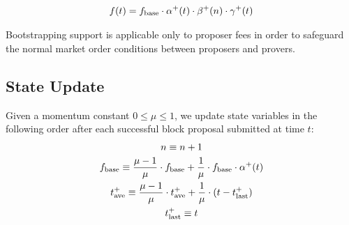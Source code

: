 
\begin{align}
f(t) = f_\textnormal{base} \cdot \alpha^+(t) \cdot \beta^+(n) \cdot \gamma^+(t)
\end{align}

Bootstrapping support is applicable only to proposer fees in order to safeguard the normal market order conditions between proposers and provers.

\subsection{State Update}
Given a momentum constant $ 0\leq \mu \leq 1$, we update state variables in the following order after each successful block proposal submitted at time $t$:
\begin{gather}
    n \equiv n + 1\\
f_\textnormal{base} \equiv
\frac{\mu-1}{\mu} \cdot f_\textnormal{base} + \frac{1}{\mu} \cdot f_\textnormal{base}\cdot \alpha^+(t)
\\
t^+_\textnormal{ave} \equiv
\frac{\mu-1}{\mu} \cdot t^+_\textnormal{ave} + \frac{1}{\mu} \cdot (t-t^+_\textnormal{last})
\\
t^+_\textnormal{last} \equiv t
\end{gather}

